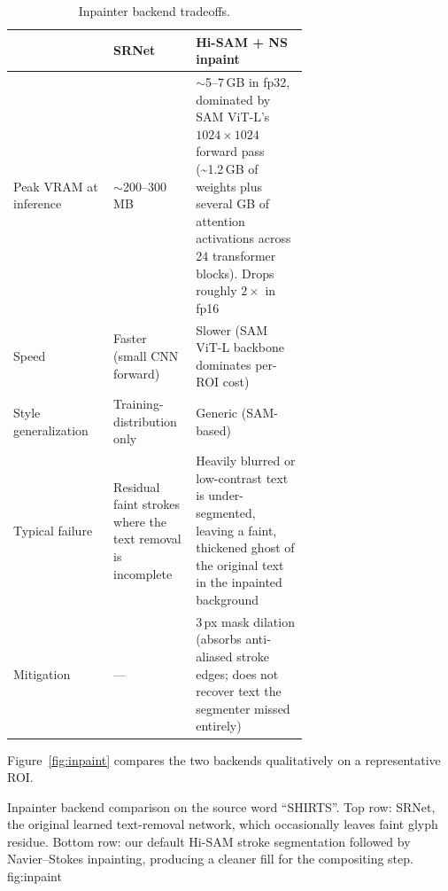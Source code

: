 \begin{table}[H]
  \centering
  \caption{Inpainter backend tradeoffs.}
  \label{tab:inpainter}
  \small
  \setlength{\tabcolsep}{4pt}
  \begin{tabular}{lp{0.28\linewidth}p{0.38\linewidth}}
    \toprule
    & SRNet & Hi-SAM + NS inpaint \\
    \midrule
    Peak VRAM at inference  & $\sim$200--300\,MB
        & $\sim$5--7\,GB in fp32, dominated by SAM ViT-L's
          $1024\times 1024$ forward pass (\textasciitilde{}1.2\,GB of
          weights plus several GB of attention activations across
          24 transformer blocks). Drops roughly $2\times$ in fp16 \\
    Speed                   & Faster (small CNN forward)
        & Slower (SAM ViT-L backbone dominates per-ROI cost) \\
    Style generalization    & Training-distribution only
        & Generic (SAM-based) \\
    Typical failure         & Residual faint strokes where the text
        removal is incomplete
        & Heavily blurred or low-contrast text is under-segmented,
          leaving a faint, thickened ghost of the original text in
          the inpainted background \\
    Mitigation              & ---
        & 3\,px mask dilation (absorbs anti-aliased stroke edges;
          does not recover text the segmenter missed entirely) \\
    \bottomrule
  \end{tabular}
\end{table}

Figure~\ref{fig:inpaint} compares the two backends qualitatively on
a representative ROI.

%
  {Inpainter backend comparison on the source word ``SHIRTS''. Top
   row: SRNet, the original learned text-removal network, which
   occasionally leaves faint glyph residue. Bottom row: our default
   Hi-SAM stroke segmentation followed by Navier--Stokes inpainting,
   producing a cleaner fill for the compositing step.}%
  {fig:inpaint}

